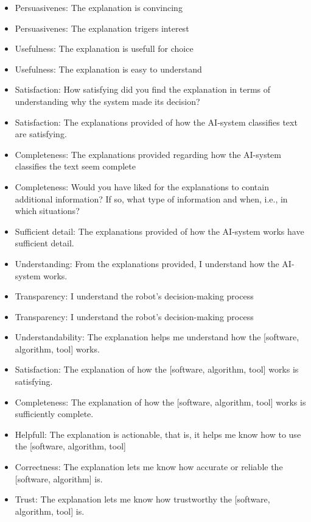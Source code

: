 \begin{itemize}
    \item Persuasivenes: The explanation is convincing \cite{sato_action-triggering_2019, sato_context_nodate}
    \item Persuasivenes: The explanation trigers interest \cite{sato_action-triggering_2019, sato_context_nodate}
    \item Usefulness: The explanation is usefull for choice \cite{sato_action-triggering_2019, sato_context_nodate}
    \item Usefulness: The explanation is easy to understand \cite{sato_action-triggering_2019, sato_context_nodate}
    \item Satisfaction: How satisfying did you find the explanation in terms of understanding why the system made its decision? \cite{riveiro_thats_2021}
    \item Satisfaction: The explanations provided of how the AI-system classifies text are satisfying. \cite{riveiro_thats_2021}
    \item Completeness: The explanations provided regarding how the AI-system classifies the text seem complete
 \cite{riveiro_thats_2021}
    \item Completeness: Would you have liked for the explanations to contain additional information? If so, what type of information and when, i.e., in which situations?
 \cite{riveiro_thats_2021}
    \item Sufficient detail: The explanations provided of how the AI-system works have sufficient detail.
 \cite{riveiro_thats_2021}
    \item Understanding: From the explanations provided, I understand how the AI-system works.
 \cite{riveiro_thats_2021}
 \item Transparency: I understand the robot’s decision-making process \cite{wang_is_2018}
 \item Transparency: I understand the robot’s decision-making process \cite{wang_is_2018}
 \item Understandability: The explanation helps me understand how the [software, algorithm, tool] works. \cite{hoffman_metrics_nodate}
 \item Satisfaction: The explanation of how the [software, algorithm, tool] works is satisfying. \cite{hoffman_metrics_nodate}
 \item Completeness: The explanation of how the [software, algorithm, tool] works is sufficiently complete. \cite{hoffman_metrics_nodate}
 \item Helpfull: The explanation is actionable, that is, it helps me know how to use the [software, algorithm, tool] \cite{hoffman_metrics_nodate}
 \item Correctness: The explanation lets me know how accurate or reliable the [software, algorithm] is.\cite{hoffman_metrics_nodate}
 \item Trust: The explanation lets me know how trustworthy the [software, algorithm, tool] is. \cite{hoffman_metrics_nodate}
\end{itemize}

